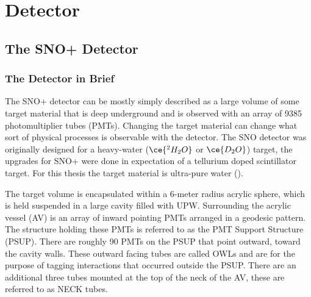 
\chapter{Detector}

\ifpdf
    \graphicspath{{detector/figures/PNG/}{detector/figures/PDF/}{detector/figures/}}
\else
    \graphicspath{{detector/figures/EPS/}{detector/figures/}}
\fi


\section{The SNO+ Detector}
\subsection{The Detector in Brief}
The SNO+ detector can be mostly simply described as a large volume of some
target material that is deep underground and is observed with an array of
9385  photomultiplier tubes (PMTs).
Changing the target material can change what sort of physical processes is
observable with the detector.
The SNO detector was originally designed for a heavy-water ($\ce{^{2}H_{2}O}$ or $\ce{D_{2}O}$)
target, the upgrades for SNO+ were done in expectation of a tellurium doped
scintillator target.
For this thesis the target material is ultra-pure water ().

The target volume is encapsulated within a 6-meter radius acrylic sphere,
which is held suspended in a large cavity filled with UPW.
Surrounding the acrylic vessel (AV) is an  array of inward pointing PMTs
arranged in a geodesic pattern.
The structure holding these PMTs is referred to as the PMT Support Structure
(PSUP).
There are roughly 90 PMTs on the PSUP that point outward, toward the cavity
walls.
These outward facing tubes are called OWLs and are for the purpose of tagging
interactions that occurred outside the PSUP.
There are an additional three tubes mounted at the top of the neck of the AV,
these are referred to as NECK tubes.

